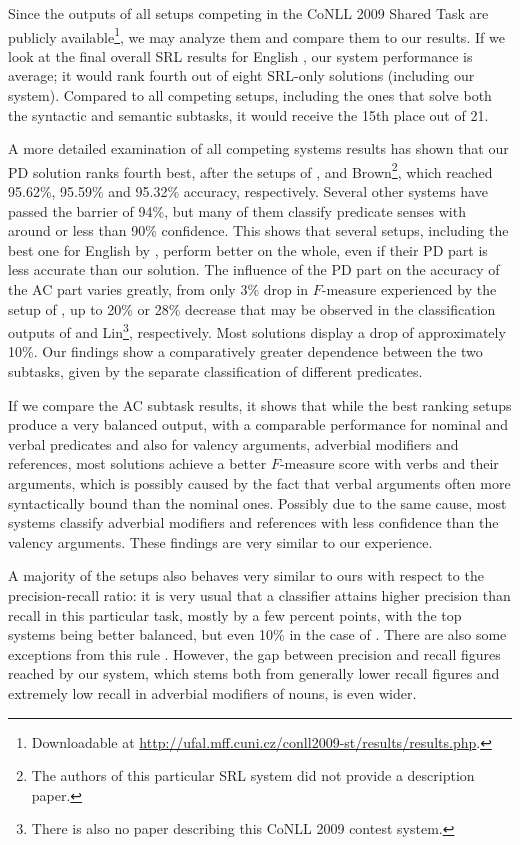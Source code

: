 \documentclass[12pt,notitlepage]{report}
\begin{document}
Since the outputs of all setups competing in the CoNLL 2009 Shared Task are publicly available\footnote{Downloadable at \url{http://ufal.mff.cuni.cz/conll2009-st/results/results.php}.}, we may analyze them and compare them to our results. If we look at the final overall SRL results for English \citep[cf. tables in][]{hajic09}, our system performance is average; it would rank fourth out of eight SRL-only solutions (including our system). Compared to all competing setups, including the ones that solve both the syntactic and semantic subtasks, it would receive the 15th place out of 21.

A more detailed examination of all competing systems results has shown that our PD solution ranks fourth best, after the setups of \citet{tackstrom09}, \citet{nugues09} and Brown\footnote{The authors of this particular SRL system did not provide a description paper.}, which reached 95.62\%, 95.59\% and 95.32\% accuracy, respectively. Several other systems have passed the barrier of 94\%, but many of them classify predicate senses with around or less than 90\% confidence. This shows that several setups, including the best one for English by \citet{chen09}, perform better on the whole, even if their PD part is less accurate than our solution. The influence of the PD part on the accuracy of the AC part varies greatly, from only 3\% drop in $F$-measure experienced by the setup of \citet{li09}, up to 20\% or 28\% decrease that may be observed in the classification outputs of \citet{nugues09} and Lin\footnote{There is also no paper describing this CoNLL 2009 contest system.}, respectively. Most solutions display a drop of approximately 10\%. Our findings show a comparatively greater dependence between the two subtasks, given by the separate classification of different predicates.

If we compare the AC subtask results, it shows that while the best ranking setups \citep{nugues09,zhao09} produce a very balanced output, with a comparable performance for nominal and verbal predicates and also for valency arguments, adverbial modifiers and references, most solutions achieve a better $F$-measure score with verbs and their arguments, which is possibly caused by the fact that verbal arguments often more syntactically bound than the nominal ones. Possibly due to the same cause, most systems classify adverbial modifiers and references with less confidence than the valency arguments. These findings are very similar to our experience.

A majority of the setups also behaves very similar to ours with respect to the precision-recall ratio: it is very usual that a classifier attains higher precision than recall in this particular task, mostly by a few percent points, with the top systems being better balanced, but even 10\% in the case of \citet{meza-ruiz09}. There are also some exceptions from this rule \citep{vallejo09}. However, the gap between precision and recall figures reached by our system, which stems both from generally lower recall figures and extremely low recall in adverbial modifiers of nouns, is even wider.
\end{document}
